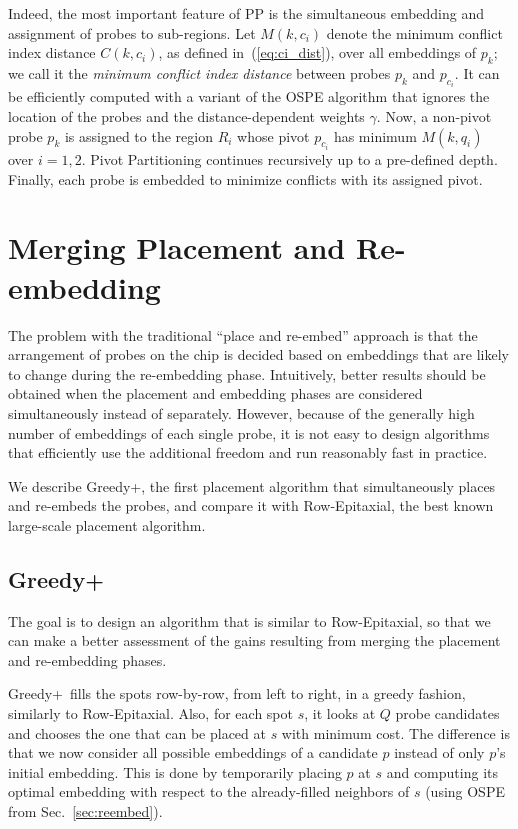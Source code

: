 \documentclass{w-edbk}
\newcommand{\Greedyplus}{Greedy+}
\begin{document}
Indeed, the most important feature of PP is the simultaneous embedding and
assignment of probes to sub-regions. Let $M(k,c_i)$ denote the minimum
conflict index distance $C(k,c_i)$, as defined in~(\ref{eq:ci_dist}), over all
embeddings of $p_k$; we call it the \emph{minimum conflict index distance}
between probes $p_k$ and $p_{c_i}$. It can be efficiently computed with a
variant of the OSPE algorithm that ignores the location of the probes and the
distance-dependent weights $\gamma$. Now, a non-pivot probe $p_k$ is assigned
to the region $R_i$ whose pivot $p_{c_i}$ has minimum $M(k,q_i)$ over $i=1,2$.
Pivot Partitioning continues recursively up to a pre-defined depth. Finally,
each probe is embedded to minimize conflicts with its assigned pivot.


\section{Merging Placement and Re-embedding}
\label{sec:merging}

The problem with the traditional ``place and re-embed'' approach is that the
arrangement of probes on the chip is decided based on embeddings that are
likely to change during the re-embedding phase. Intuitively, better results
should be obtained when the placement and embedding phases are considered
simultaneously instead of separately. However, because of the generally high
number of embeddings of each single probe, it is not easy to design algorithms
that efficiently use the additional freedom and run reasonably fast in
practice.

We describe \Greedyplus, the first placement algorithm that simultaneously
places and re-embeds the probes, and compare it with Row-Epitaxial, the best
known large-scale placement algorithm.


\subsection{\Greedyplus}

The goal is to design an algorithm that is similar to Row-Epitaxial, so that we
can make a better assessment of the gains resulting from merging the placement
and re-embedding phases.

\Greedyplus\ fills the spots row-by-row, from left to right, in a
greedy fashion, similarly to Row-Epitaxial. Also, for each spot $s$,
it looks at $Q$ probe candidates and chooses the one that can be
placed at $s$ with minimum cost. The difference is that we now
consider all possible embeddings of a candidate $p$ instead of only
$p$'s initial embedding. This is done by temporarily placing $p$ at
$s$ and computing its optimal embedding with respect to the
already-filled neighbors of $s$ (using OSPE from
Sec.~\ref{sec:reembed}).
\end{document}
